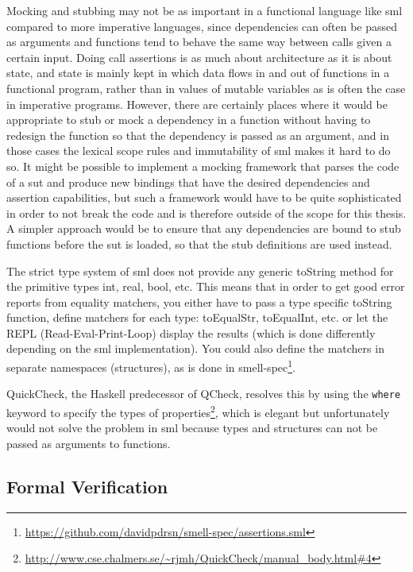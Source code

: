 \documentclass[11pt]{article}
\begin{document}
Mocking and stubbing may not be as important in a functional language like \gls{sml} compared to more imperative languages, since dependencies can often be passed as arguments and functions tend to behave the same way between calls given a certain input. Doing call assertions is as much about architecture as it is about state, and state is mainly kept in which data flows in and out of functions in a functional program, rather than in values of mutable variables as is often the case in imperative programs. However, there are certainly places where it would be appropriate to stub or mock a dependency in a function without having to redesign the function so that the dependency is passed as an argument, and in those cases the lexical scope rules and immutability of \gls{sml} makes it hard to do so. It might be possible to implement a mocking framework that parses the code of a \gls{sut} and produce new bindings that have the desired dependencies and assertion capabilities, but such a framework would have to be quite sophisticated in order to not break the code and is therefore outside of the scope for this thesis. A simpler approach would be to ensure that any dependencies are bound to stub functions before the \gls{sut} is loaded, so that the stub definitions are used instead. %

The strict type system of \gls{sml} does not provide any generic toString method for the primitive types int, real, bool, etc. This means that in order to get good error reports from equality \glspl{matcher}, you either have to pass a type specific toString function, define \glspl{matcher} for each type: toEqualStr, toEqualInt, etc. or let the REPL (Read-Eval-Print-Loop) display the results (which is done differently depending on the \gls{sml} implementation). You could also define the \glspl{matcher} in separate namespaces (structures), as is done in smell-spec\footnote{\url{https://github.com/davidpdrsn/smell-spec/assertions.sml}}.

QuickCheck, the Haskell predecessor of QCheck, resolves this by using the \texttt{where} keyword to specify the types of properties\footnote{\url{http://www.cse.chalmers.se/~rjmh/QuickCheck/manual\_body.html\#4}}, which is elegant but unfortunately would not solve the problem in \gls{sml} because types and structures can not be passed as arguments to functions. %

\subsection{Formal Verification}
\label{subsec:formalverification}
\end{document}
